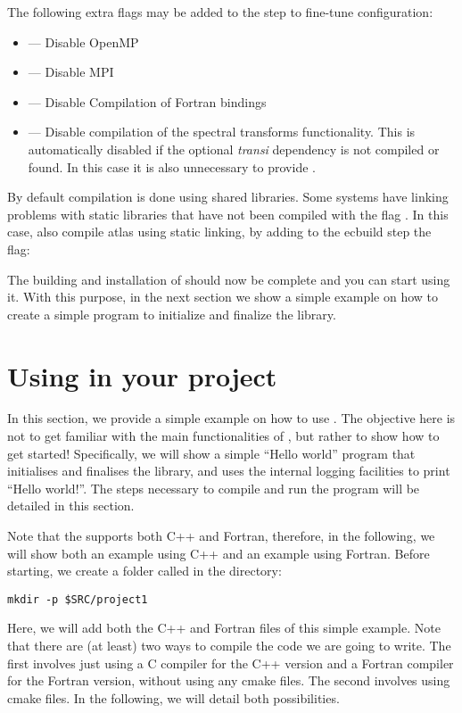 The following extra flags may be added to the  
step to fine-tune configuration:
\begin{itemize}
\setlength\itemsep{0.1em}
\item {} --- Disable OpenMP
\item {} --- Disable MPI
\item {} --- Disable Compilation of Fortran bindings
\item {} --- Disable compilation of the spectral transforms
       functionality. This is automatically disabled if the optional \emph{transi}
       dependency is not compiled or found. In this case it is also unnecessary to
       provide .
\end{itemize}
%
%
\begin{notebox}
By default compilation is done using shared libraries. Some systems have 
linking problems with static libraries that have not been compiled with 
the flag . In this case, also compile atlas using static 
linking, by adding to the ecbuild step the flag: 
\end{notebox}
%
The building and installation of \Atlas should now be complete 
and you can start using it. With this purpose, in the next 
section we show a simple example on how to create a simple 
program to initialize and finalize the library.




\section{Using \Atlas in your project}
\label{s:using}
In this section, we provide a simple example on how to use \Atlas.
The objective here is not to get familiar with the main 
functionalities of \Atlas, but rather to show how to get started!
Specifically, we will show a simple ``Hello world'' program that
initialises and finalises the library, and uses the internal \Atlas
logging facilities to print ``Hello world!''.
The steps necessary to compile and run the program will be detailed
in this section.

Note that the \Atlas supports both C++ and Fortran, therefore, 
in the following, we will show both an example using C++ and 
an example using Fortran. Before starting, we create a folder 
called  in the  directory:
%
\begin{lstlisting}[style=BashStyle]
mkdir -p $SRC/project1
\end{lstlisting}
%
Here, we will add both the C++ and Fortran files of this 
simple example. Note that there are (at least) two ways 
to compile the code we are going to write. The first involves 
just using a C compiler for the C++ version and a Fortran 
compiler for the Fortran version, without using any cmake 
files. The second involves using cmake files. In the following, 
we will detail both possibilities.

